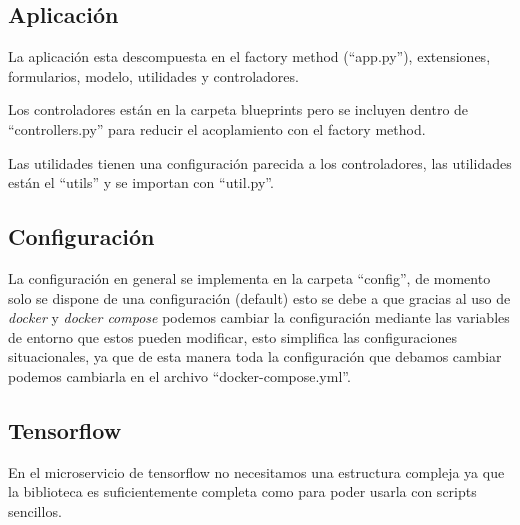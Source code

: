 \subsection{Aplicación}
La aplicación esta descompuesta en el factory method (``app.py''), extensiones, formularios, modelo, utilidades y controladores.

Los controladores están en la carpeta blueprints pero se incluyen dentro de ``controllers.py'' para reducir el acoplamiento con el factory method.

Las utilidades tienen una configuración parecida a los controladores, las utilidades están el ``utils'' y se importan con ``util.py''.


\subsection{Configuración}
La configuración en general se implementa en la carpeta ``config'', de momento solo se dispone de una configuración (default) esto se debe a que gracias al uso de \emph{docker} y \emph{docker compose} podemos cambiar la configuración mediante las variables de entorno que estos pueden modificar, esto simplifica las configuraciones situacionales, ya que de esta manera toda la configuración que debamos cambiar podemos cambiarla en el archivo ``docker-compose.yml''.

\subsection{Tensorflow}
En el microservicio de tensorflow no necesitamos una estructura compleja ya que la biblioteca es suficientemente completa como para poder usarla con scripts sencillos.




